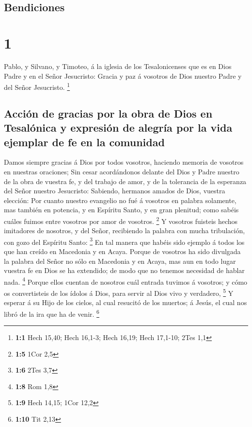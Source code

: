 \hypertarget{bendiciones}{%
\subsection{Bendiciones}\label{bendiciones}}

\hypertarget{section}{%
\section{1}\label{section}}

 Pablo, y Silvano, y Timoteo, á la iglesia de los
Tesalonicenses que es en Dios Padre y en el Señor Jesucristo: Gracia y
paz á vosotros de Dios nuestro Padre y del Señor Jesucristo. \footnote{\textbf{1:1}
  Hech 15,40; Hech 16,1-3; Hech 16,19; Hech 17,1-10; 2Tes 1,1}

\hypertarget{acciuxf3n-de-gracias-por-la-obra-de-dios-en-tesaluxf3nica-y-expresiuxf3n-de-alegruxeda-por-la-vida-ejemplar-de-fe-en-la-comunidad}{%
\subsection{Acción de gracias por la obra de Dios en Tesalónica y
expresión de alegría por la vida ejemplar de fe en la
comunidad}\label{acciuxf3n-de-gracias-por-la-obra-de-dios-en-tesaluxf3nica-y-expresiuxf3n-de-alegruxeda-por-la-vida-ejemplar-de-fe-en-la-comunidad}}

 Damos siempre gracias á Dios por todos vosotros, haciendo
memoria de vosotros en nuestras oraciones;  Sin cesar
acordándonos delante del Dios y Padre nuestro de la obra de vuestra fe,
y del trabajo de amor, y de la tolerancia de la esperanza del Señor
nuestro Jesucristo:  Sabiendo, hermanos amados de Dios,
vuestra elección:  Por cuanto nuestro evangelio no fué á
vosotros en palabra solamente, mas también en potencia, y en Espíritu
Santo, y en gran plenitud; como sabéis cuáles fuimos entre vosotros por
amor de vosotros. \footnote{\textbf{1:5} 1Cor 2,5}  Y
vosotros fuisteis hechos imitadores de nosotros, y del Señor, recibiendo
la palabra con mucha tribulación, con gozo del Espíritu Santo:
\footnote{\textbf{1:6} 2Tes 3,7}  En tal manera que habéis
sido ejemplo á todos los que han creído en Macedonia y en Acaya.
 Porque de vosotros ha sido divulgada la palabra del Señor
no sólo en Macedonia y en Acaya, mas aun en todo lugar vuestra fe en
Dios se ha extendido; de modo que no tenemos necesidad de hablar nada.
\footnote{\textbf{1:8} Rom 1,8}  Porque ellos cuentan de
nosotros cuál entrada tuvimos á vosotros; y cómo os convertisteis de los
ídolos á Dios, para servir al Dios vivo y verdadero, \footnote{\textbf{1:9}
  Hech 14,15; 1Cor 12,2}  Y esperar á su Hijo de los
cielos, al cual resucitó de los muertos; á Jesús, el cual nos libró de
la ira que ha de venir. \footnote{\textbf{1:10} Tit 2,13}

